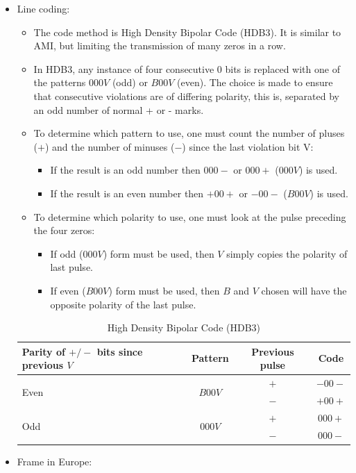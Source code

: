 \documentclass[
	12pt,
	twoside
]{book}
\begin{document}
\begin{itemize}
	\item {
		Line coding:
		\begin{itemize}
			\item The code method is High Density Bipolar Code (HDB3). It is similar to AMI, but limiting the transmission of many zeros in a row.
			\item In HDB3, any instance of four consecutive 0 bits is replaced with one of the patterns $000V$ (odd) or $B00V$ (even). The choice is made to ensure that consecutive violations are of differing polarity, this is, separated by an odd number of normal + or - marks.
			\item {
				To determine which pattern to use, one must count the number of pluses ($+$) and the number of minuses ($-$) since the last violation bit V:
				\begin{itemize}
					\item If the result is an odd number then $000-$ or $000+$ ($000V$) is used.
					\item If the result is an even number then $+00+$ or $-00-$ ($B00V$) is used.
				\end{itemize}
			}
			\item {
				To determine which polarity to use, one must look at the pulse preceding the four zeros:
				\begin{itemize}
					\item If odd ($000V$) form must be used, then $V$ simply copies the polarity of last pulse.
					\item If even ($B00V$) form must be used, then $B$ and $V$ chosen will have the opposite polarity of the last pulse.
				\end{itemize}
			}
		\end{itemize}
		\begin{table}
			\centering
			\begin{tabular}{|l|c|c|c|}
				\hline
				Parity of $+/-$ bits since previous $V$	& Pattern					& Previous pulse	& Code \\
				\hline
				\multirow{2}{*}{Even}					& \multirow{2}{*}{$B00V$}	& $+$				& $-00-$ \\
				\cline{3-4}
														&							& $-$				& $+00+$ \\
				\hline
				\multirow{2}{*}{Odd}					& \multirow{2}{*}{$000V$}	& $+$				& $000+$ \\
				\cline{3-4}
														&							& $-$				& $000-$ \\
				\hline
			\end{tabular}
			\caption{
				\label{tab:HDB3}
				High Density Bipolar Code (HDB3)
			}
		\end{table}
	}
	\item {
		Frame in Europe:

}
\end{itemize}
\end{document}

